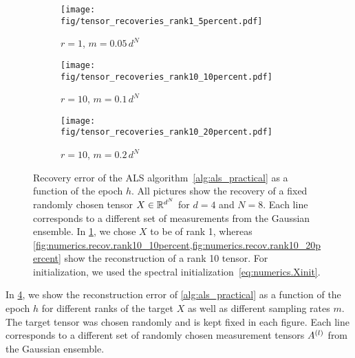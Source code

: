\begin{figure*}
  \begin{subfigure}{.3 \columnwidth}
    \texttt{[image: fig/tensor\_recoveries\_rank1\_5percent.pdf]}
    \caption{%
      \label{fig:numerics.recov.rank1_5percent}%
      $r = 1$, $m = 0.05 \, d^N$
    }
  \end{subfigure}
  \begin{subfigure}{.3 \columnwidth}
    \texttt{[image: fig/tensor\_recoveries\_rank10\_10percent.pdf]}
    \caption{%
      \label{fig:numerics.recov.rank10_10percent}%
      $r = 10$, $m = 0.1 \, d^N$
    }
  \end{subfigure}
  \begin{subfigure}{.3 \columnwidth}
    \texttt{[image: fig/tensor\_recoveries\_rank10\_20percent.pdf]}
    \caption{%
      \label{fig:numerics.recov.rank10_20percent}%
      $r = 10$, $m = 0.2 \, d^N$
    }
  \end{subfigure}
  \caption{%
    \label{fig:numerics.recov}%
    Recovery error of the ALS algorithm~\ref{alg:als_practical} as a function of the epoch $h$.
    All pictures show the recovery of a fixed randomly chosen tensor $X \in {\mathbb{R}}^{d^N}$ for $d = 4$ and $N = 8$.
    Each line corresponds to a different set of measurements from the Gaussian ensemble.
    In \cref{fig:numerics.recov.rank1_5percent}, we chose $X$ to be of rank 1, whereas \cref{fig:numerics.recov.rank10_10percent,fig:numerics.recov.rank10_20percent} show the reconstruction of a rank 10 tensor.
    For initialization, we used the spectral initialization~\eqref{eq:numerics.Xinit}.
  }
\end{figure*}

In \cref{fig:numerics.recov}, we show the reconstruction error of \cref{alg:als_practical} as a function of the epoch $h$ for different ranks of the target $X$ as well as different sampling rates $m$.
The target tensor was chosen randomly and is kept fixed in each figure.
Each line corresponds to a different set of randomly chosen measurement tensors $A^{(l)}$ from the Gaussian ensemble.

